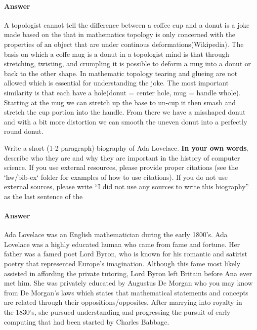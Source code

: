 \documentclass{article}
\begin{document}
\begin{enumerate}
        \paragraph{Answer}
        A topologist cannot tell the difference between a coffee cup and a
        donut is a joke made based on the that in mathematics topology is
        only concerned with the properties of an object that are under
        continous deformations(Wikipedia). The basis on which a coffe mug
        is a donut in a topologist mind is that through stretching, twisting,
        and crumpling it is possible to deform a mug into a donut or back to the
        other shape. In mathematic topology tearing and glueing are not allowed
        which is essential for understanding the joke. The most important
        similarity is that each have a hole(donut = center hole, mug =
        handle whole). Starting at the mug we can stretch up the base to
        un-cup it then smash and stretch the cup portion into the handle.
        From there we have a misshaped donut and with a bit more distortion we
        can smooth the uneven donut into a perfectly round donut.

\end{enumerate}


Write a short (1-2 paragraph) biography of Ada Lovelace.
\textbf{In your own words}, describe who they are and why they are important in
the history of computer science.  If you use external resources, please provide
proper citations (see the `hw/bib-ex` folder for examples of how to use
citations). If you do not use external sources, please write ``I did not
use any sources to write this biography'' as the last sentence of the
\paragraph{Answer}

Ada Lovelace was an English mathematician during the early 1800's.
Ada Lovelace was a highly educated human who came from fame and fortune.
Her father was a famed poet Lord Byron, who is known for his romantic and
satirist poetry that represented Europe's imagination. Although this fame
most likely assisted in affording the private tutoring, Lord Byron left Britain
before Ana ever met him. She was privately educated by Augustus De Morgan who
you may know from De Morgan's laws which states that mathematical statements
and concepts are related through their oppositions/opposites.
After marrying into royalty in the 1830's, she pursued understanding and
progressing the pursuit of early computing that had been started
by Charles Babbage.
\end{document}
